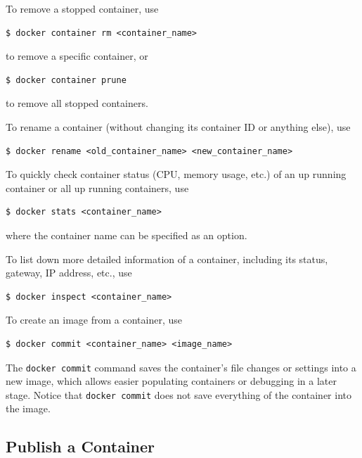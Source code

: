To remove a stopped container, use
\begin{lstlisting}
$ docker container rm <container_name>
\end{lstlisting}
to remove a specific container, or
\begin{lstlisting}
$ docker container prune
\end{lstlisting}
to remove all stopped containers.

To rename a container (without changing its container ID or anything else), use
\begin{lstlisting}
$ docker rename <old_container_name> <new_container_name>
\end{lstlisting}

To quickly check container status (CPU, memory usage, etc.) of an up running container or all up running containers, use
\begin{lstlisting}
$ docker stats <container_name>
\end{lstlisting}
where the container name can be specified as an option.

To list down more detailed information of a container, including its status, gateway, IP address, etc., use
\begin{lstlisting}
$ docker inspect <container_name>
\end{lstlisting}

To create an image from a container, use
\begin{lstlisting}
$ docker commit <container_name> <image_name>
\end{lstlisting}
The \verb|docker commit| command saves the container's file changes or settings into a new image, which allows easier populating containers or debugging in a later stage. Notice that \verb|docker commit| does not save everything of the container into the image.

\subsection{Publish a Container}

